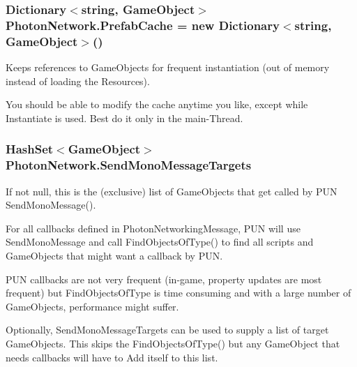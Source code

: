 \subsubsection[{\texorpdfstring{Prefab\+Cache}{PrefabCache}}]{\setlength{\rightskip}{0pt plus 5cm}Dictionary$<$string, Game\+Object$>$ Photon\+Network.\+Prefab\+Cache = new Dictionary$<$string, Game\+Object$>$()\hspace{0.3cm}{\ttfamily [static]}}\hypertarget{class_photon_network_a5d231578fbaadcb89dd592d2d8ddfd0a}{}\label{class_photon_network_a5d231578fbaadcb89dd592d2d8ddfd0a}


Keeps references to Game\+Objects for frequent instantiation (out of memory instead of loading the Resources). 

You should be able to modify the cache anytime you like, except while Instantiate is used. Best do it only in the main-\/\+Thread. 
\subsubsection[{\texorpdfstring{Send\+Mono\+Message\+Targets}{SendMonoMessageTargets}}]{\setlength{\rightskip}{0pt plus 5cm}Hash\+Set$<$Game\+Object$>$ Photon\+Network.\+Send\+Mono\+Message\+Targets\hspace{0.3cm}{\ttfamily [static]}}\hypertarget{class_photon_network_a71b2a9299c3906b3e3d49f0ac296a87b}{}\label{class_photon_network_a71b2a9299c3906b3e3d49f0ac296a87b}


If not null, this is the (exclusive) list of Game\+Objects that get called by P\+UN Send\+Mono\+Message(). 

For all callbacks defined in Photon\+Networking\+Message, P\+UN will use Send\+Mono\+Message and call Find\+Objects\+Of\+Type() to find all scripts and Game\+Objects that might want a callback by P\+UN.

P\+UN callbacks are not very frequent (in-\/game, property updates are most frequent) but Find\+Objects\+Of\+Type is time consuming and with a large number of Game\+Objects, performance might suffer.

Optionally, Send\+Mono\+Message\+Targets can be used to supply a list of target Game\+Objects. This skips the Find\+Objects\+Of\+Type() but any Game\+Object that needs callbacks will have to Add itself to this list.


